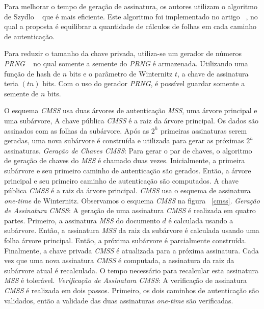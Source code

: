\documentclass{SBCbookchapter}
\begin{document}
\begin{otherlanguage}{brazilian}
Para melhorar o tempo de geração de assinatura, os autores utilizam o algoritmo de Szydlo ~\cite{szydlo:03} que é mais eficiente. 
Este algoritmo foi implementado no artigo ~\cite{buch:08}, no qual a proposta é equilibrar a quantidade de cálculos de folhas em cada caminho de autenticação.

Para reduzir o tamanho da chave privada, utiliza-se um gerador de números \textit{PRNG} ~\cite{DSS:07} no qual somente a semente do \textit{PRNG} é armazenada. 
Utilizando uma função de hash de $n$ bits e o parâmetro de Winternitz $t$, a chave de assinatura teria $(tn)$ bits. Com o uso do gerador \textit{PRNG}, é possível guardar somente a semente de $n$ bits.

O esquema \textit{CMSS} usa duas árvores de autenticação \textit{MSS}, uma árvore principal e uma subárvore,
A chave pública \textit{CMSS} é a raiz da árvore principal. Os dados são assinados com as folhas da subárvore. 
Após as $2^h$ primeiras assinaturas serem geradas, uma nova subárvore é construída e utilizada para gerar as próximas $2^h$ assinaturas. 
\newline \newline \textit{Geração de Chaves CMSS}: Para gerar o par de chaves, o algoritmo de geração de chaves do \textit{MSS} é chamado duas vezes. 
Inicialmente, a primeira subárvore e seu primeiro ca\-minho de autenticação são gerados. 
Então, a árvore principal e seu primeiro ca\-minho de autenticação são computados. 
A chave pública \textit{CMSS} é a raiz da árvore principal. \textit{CMSS} usa o esquema de assinatura \textit{one-time} de Winternitz. 
Observamos o esquema \textit{CMSS} na figura ~\ref{cmss}.
\newline \newline \textit{Geração de Assinatura CMSS}: A geração de uma assinatura \textit{CMSS} é realizada em quatro partes. Primeiro, a assinatura \textit{MSS} do documento $d$ é calculada usando a subárvore. 
Então, a assinatura \textit{MSS} da raiz da subárvore é calculada usando uma folha árvore principal. Então, a próxima subárvore é parcialmente construída. 
Finalmente, a chave privada \textit{CMSS} é atualizada para a próxima assinatura.
Cada vez que uma nova assinatura \textit{CMSS} é computada, a assinatura da raiz da subárvore atual é recalculada. O tempo necessário para recalcular esta assinatura \textit{MSS} é tolerável.
\newline \newline \textit{Verificação de Assinatura CMSS}: A verificação de assinatura \textit{CMSS} é realizada em dois  passos. 
Primeiro, os dois caminhos de autenticação são validados, então a validade das duas assinaturas \textit{one-time} são verificadas. 


\end{otherlanguage}
\end{document}
